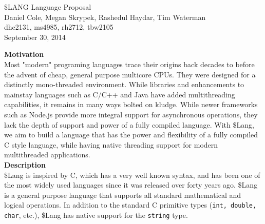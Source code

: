 \documentclass[11pt, oneside]{article}   	%
\date{}							%
\begin{document}
\begin{center}
\LARGE
\$LANG Language Proposal\\[2em]
\Large 
Daniel Cole, Megan Skrypek, Rashedul Haydar, Tim Waterman\\
\large dhc2131, ms4985, rh2712, tbw2105\\[2em]
\normalsize
September 30, 2014\\[3em]
\end{center}

\LARGE\textbf{Motivation}\\[.5em]
\normalsize
Most "modern" programing languages trace their origins back decades to before the advent of cheap, general purpose multicore CPUs.  They were designed for a distinctly mono-threaded environment.  While libraries and enhancements to mainstay languages such as C/C++ and Java have added multithreading capabilities, it remains in many ways bolted on kludge.  While newer frameworks such as Node.js provide more integral support for asynchronous operations, they lack the depth of support and power of a fully compiled language.  With \$Lang, we aim to build a language that has the power and flexibility of a fully compiled C style language, while having native threading support for modern multithreaded applications.
\\[3em]
\LARGE\textbf{Description}\\[.5em]
\normalsize
\$Lang is inspired by C, which has a very well known syntax, and has been one of the most widely used languages since it was released over forty years ago.  \$Lang is a general purpose language that supports all standard mathematical and logical operations.  In addition to the standard C primitive types (\verb|int, double, char|, etc.), \$Lang has native support for the \verb|string| type.  
\end{document}

